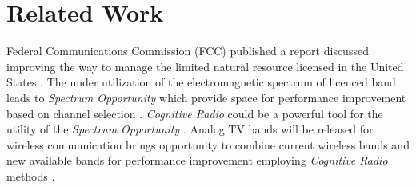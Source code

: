 \section{Related Work}
\label{sec:related}



Federal Communications Commission (FCC) published a report discussed improving the way to manage the limited natural resource licensed in the United States \cite{federal2002spectrum}. The under utilization of the electromagnetic spectrum of licenced band leads to \emph{Spectrum Opportunity} which provide space for performance improvement based on channel selection \cite{kolodzy2001next}.
\emph{Cognitive Radio} could be a powerful tool for the utility of the \emph{Spectrum Opportunity} \cite{haykin2005cognitive}.
Analog TV bands will be released for wireless communication brings opportunity to combine current wireless bands and new available bands for performance improvement employing \emph{Cognitive Radio} methods \cite{MOAR}. 


